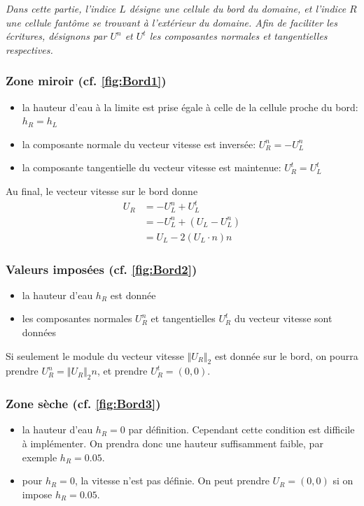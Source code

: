 \documentclass[
	french,
	11pt, %
]{fphw}
\begin{document}
\textit{Dans cette partie, l'indice $L$ désigne une cellule du bord du domaine, et l'indice $R$ une cellule fantôme se trouvant à l'extérieur du domaine. Afin de faciliter les écritures, désignons par $U^n$ et $U^t$ les composantes normales et tangentielles respectives.}

\subsubsection*{Zone miroir (cf. \cref{fig:Bord1})}
\begin{itemize}
	\item la hauteur d'eau à la limite est prise égale à celle de la cellule proche du bord: $h_R = h_L$
	\item la composante normale du vecteur vitesse est inversée: $U_R^n = -U_L^n$ 
	\item la composante tangentielle du vecteur vitesse est maintenue: $U_R^t = U_L^t$
\end{itemize}
Au final, le vecteur vitesse sur le bord donne
\begin{align*}
	U_R &= -U^n_L + U^t_L \\
	&= -U^n_L + (U_L -U^n_L) \\
	&= U_L - 2(U_L \cdot n)n 
\end{align*}  

\subsubsection*{Valeurs imposées (cf. \cref{fig:Bord2})}
\begin{itemize}
	\item la hauteur d'eau $h_R$ est donnée
	\item les composantes normales $U_R^n$ et tangentielles $U_R^t$ du vecteur vitesse sont données 
\end{itemize}
Si seulement le module du vecteur vitesse $\Vert U_R \Vert_2$ est donnée sur le bord, on pourra prendre $U_R^n = \Vert U_R \Vert_2 n$, et prendre $U_R^t = (0,0)$.

\subsubsection*{Zone sèche (cf. \cref{fig:Bord3})}
\begin{itemize}
	\item la hauteur d'eau $h_R = 0$ par définition. Cependant cette condition est difficile à implémenter. On prendra donc une hauteur suffisamment faible, par exemple $h_R = 0.05$.
	\item pour $h_R=0$, la vitesse n'est pas définie. On peut prendre $U_R = (0,0)$ si on impose $h_R = 0.05$.
\end{itemize}
\end{document}
